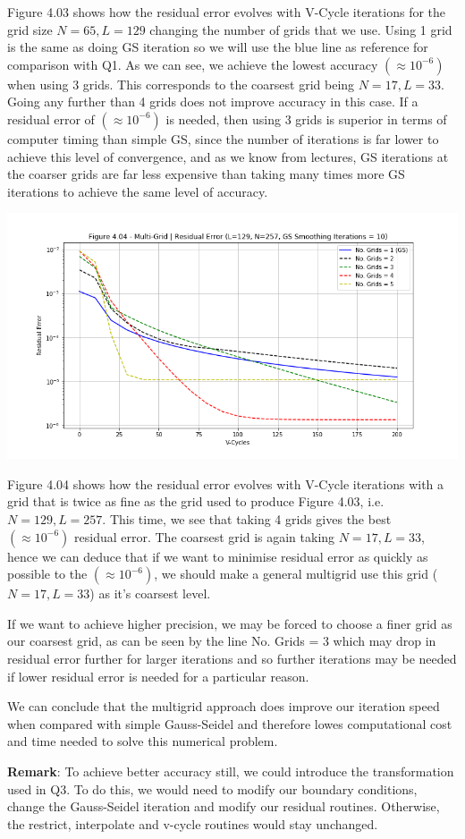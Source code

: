 \documentclass[12pt]{article}
\begin{document}
    Figure 4.03 shows how the residual error evolves with V-Cycle iterations for the grid size $N=65, L=129$ changing the number of grids that we use. Using 1 grid is the same as doing GS iteration so we will use the blue line as reference for comparison with Q1. As we can see, we achieve the lowest accuracy $(\approx 10^{-6})$ when using 3 grids. This corresponds to the coarsest grid being $N=17, L=33$. Going any further than 4 grids does not improve accuracy in this case. If a residual error of $(\approx 10^{-6})$ is needed, then using 3 grids is superior in terms of computer timing than simple GS, since the number of iterations is far lower to achieve this level of convergence, and as we know from lectures, GS iterations at the coarser grids are far less expensive than taking many times more GS iterations to achieve the same level of accuracy.

    \includegraphics[width=\textwidth]{fig4.04}

    Figure 4.04 shows how the residual error evolves with V-Cycle iterations with a grid that is twice as fine as the grid used to produce Figure 4.03, i.e. $N=129, L=257$. This time, we see that taking 4 grids gives the best $(\approx 10^{-6})$ residual error. The coarsest grid is again taking  $N=17, L=33$, hence we can deduce that if we want to minimise residual error as quickly as possible to the $(\approx 10^{-6})$, we should make a general multigrid use this grid ($N=17, L=33$) as it's coarsest level.

    If we want to achieve higher precision, we may be forced to choose a finer grid as our coarsest grid, as can be seen by the line No. Grids = 3 which may drop in residual error further for larger iterations and so further iterations may be needed if lower residual error is needed for a particular reason.

    We can conclude that the multigrid approach does improve our iteration speed when compared with simple Gauss-Seidel and therefore lowes computational cost and time needed to solve this numerical problem.

    \textbf{Remark}: To achieve better accuracy still, we could introduce the transformation used in Q3. To do this, we would need to modify our boundary conditions, change the Gauss-Seidel iteration and modify our residual routines. Otherwise, the restrict, interpolate and v-cycle routines would stay unchanged.
\end{document}
